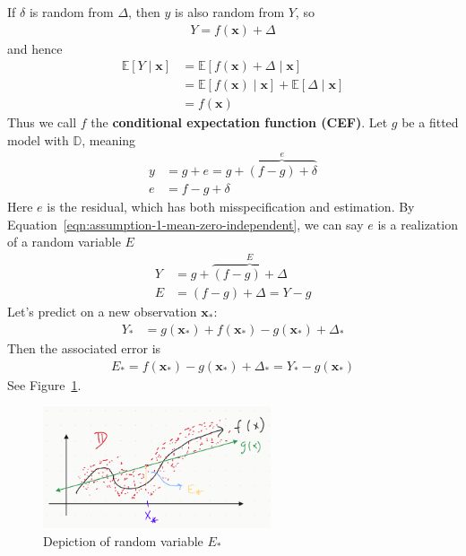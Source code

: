 \documentclass[12pt, a4paper]{article}
\theoremstyle{definition}
\begin{document}
	If $\delta$ is random from
	$\Delta$, then $y$ is also random from $Y$, so
	\begin{align}
		Y = f(\bm{x}) + \Delta
		\label{eqn:Y-rv-on-Delta}
	\end{align}
	and hence
	\begin{align}
		\mathbb{E}[Y \mid \bm{x}]
		&= \mathbb{E}[f(\bm{x}) + \Delta \mid \bm{x}]\nonumber\\
		&=\mathbb{E}[f(\bm{x})\mid \bm{x}] + \mathbb{E}[\Delta \mid \bm{x}]\nonumber\\
		&= f(\bm{x})
		\tag{by (I)}
	\end{align}
	Thus we call $f$ the \textbf{conditional expectation function (CEF)}.
	Let $g$ be a fitted model with $\mathbb{D}$, meaning
	\begin{align*}
		y &= g + e = g + \overbrace{(f - g) + \delta}^{e}\\
		e &= f - g + \delta
	\end{align*}
	Here $e$ is the residual, which has both misspecification and estimation.
	By Equation~\ref{eqn:assumption-1-mean-zero-independent}, we can say $e$ is a
	realization of a random variable $E$
	\begin{align*}
		Y &= g + \overbrace{(f - g) + \Delta}^{E}\\
		E &= (f-g) + \Delta = Y - g
	\end{align*}
	Let's predict on a new observation $\bm{x}_*$:
	\begin{align*}
		Y_* &= g(\bm{x}_*) + f(\bm{x}_*) - g(\bm{x}_*) + \Delta_*
	\end{align*}
	Then the associated error is
	\begin{align}
		E_* = f(\bm{x}_*) - g(\bm{x}_*) + \Delta_* = Y_* - g(\bm{x}_*)
		\label{eqn:error-rv}
	\end{align}
	See Figure~\ref{fig:prediction-error-rv}.
	\begin{figure}
		\centering
		\includegraphics[width=0.6\textwidth]{prediction-error-random-variable}
		\caption{Depiction of random variable $E_*$}
		\label{fig:prediction-error-rv}
	\end{figure}
\end{document}
